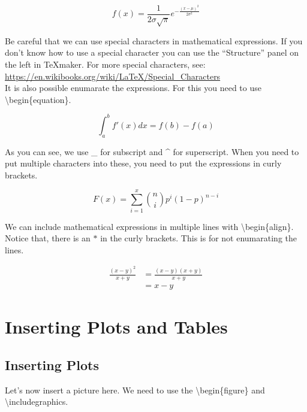 \documentclass[12pt]{article}
\begin{document}
$$ f(x) = \frac{1}{2\sigma\sqrt{\pi}} e^{-\frac{(x - \mu)^2}{2\sigma^2}} $$

Be careful that we can use special characters in mathematical expressions. If you don't know how to use a special character you can use the ``Structure'' panel on the left in TeXmaker. For more special characters, see: \url{https://en.wikibooks.org/wiki/LaTeX/Special_Characters} \\

It is also possible enumarate the expressions. For this you need to use \textbackslash begin\{equation\}. 

\begin{equation}
\int_a^b f'(x)dx = f(b) - f(a)
\end{equation}

As you can see, we use \_ for subscript and \^{} for superscript. When you need to put multiple characters into these, you need to put the expressions in curly brackets. 

\begin{equation}
F(x) = \sum_{i = 1}^x {n \choose i} p^i (1 - p)^{n - i}
\end{equation}

We can include mathematical expressions in multiple lines with \textbackslash begin\{align\}. Notice that, there is an $\ast$ in the curly brackets. This is for not enumarating the lines. 
 
\begin{align*}
\frac{(x - y)^2}{x + y} &= \frac{(x - y)(x + y)}{x + y} \\
						&= x - y
\end{align*}

\section{Inserting Plots and Tables} \label{plotsTables}

\subsection{Inserting Plots} \label{plots}

Let's now insert a picture here. We need to use the \textbackslash begin\{figure\} and \textbackslash includegraphics.
\end{document}
